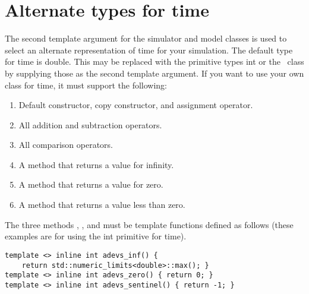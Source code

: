 \chapter{Alternate types for time}
\label{section:time}
The second template argument for the simulator and model classes is used to select an alternate representation of time for your simulation. The default type for time is double. This may be replaced with the primitive types int or the \adevs\ class  by supplying those as the second template argument. If you want to use your own class for time, it must support the following:
\begin{enumerate}
\item Default constructor, copy constructor, and assignment operator.
\item All addition and subtraction operators.
\item All comparison operators.
\item A method  that returns a value for infinity.
\item A method  that returns a value for zero.
\item A method  that returns a value less than zero.
\end{enumerate}
The three methods , , and  must be template functions defined as follows (these examples are for using the int primitive for time).
\begin{verbatim}
template <> inline int adevs_inf() {
    return std::numeric_limits<double>::max(); }
template <> inline int adevs_zero() { return 0; }
template <> inline int adevs_sentinel() { return -1; }
\end{verbatim}
